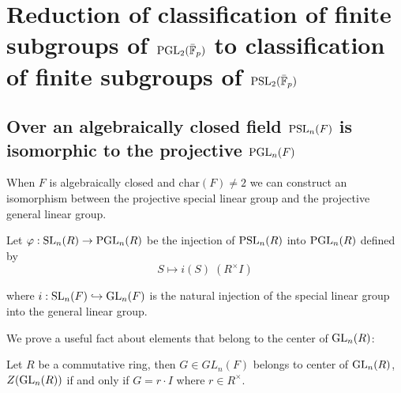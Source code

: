 \chapter{Reduction of classification of finite subgroups of $\operatorname{PGL}_2(\bar{\mathbb{F}}_p)$ to classification of finite subgroups of $\operatorname{PSL}_2(\bar{\mathbb{F}}_p)$}\label{Ch4_ReductionOfProblem}

\section{Over an algebraically closed field $\operatorname{PSL}_n(F)$ is isomorphic to the projective $\operatorname{PGL}_n(F)$}


When $F$ is algebraically closed and $\textrm{char}(F) \neq 2$ we can construct an isomorphism between the projective special linear group and the projective general linear group.
\begin{definition}
\label{SL_monoidHom_PGL}
\leanok
    Let $\varphi : \operatorname{SL}_n(R) \rightarrow \operatorname{PGL}_n(R)$ be the injection of $\operatorname{PSL}_n(R)$ into $\operatorname{PGL}_n(R)$ defined by
    \[
     S \mapsto i(S) \;  (R^\times I) 
    \]

    where $i : \operatorname{SL}_n(F) \hookrightarrow \operatorname{GL}_n(F)$ is the natural injection of the special linear group into the general linear group.
\end{definition}


We prove a useful fact about elements that belong to the center of $\operatorname{GL}_n(R)$:

\begin{lemma}
    \label{GeneralLinearGroup.mem_center_general_linear_group_iff}
    \leanok
     Let $R$ be a commutative ring, then $G \in GL_n(F)$ belongs to center of $\operatorname{GL}_n(R)$, $Z(\operatorname{GL}_n(R))$ if and only if $G = r \cdot I$ where $r \in R^\times$.
    \end{lemma}
    
